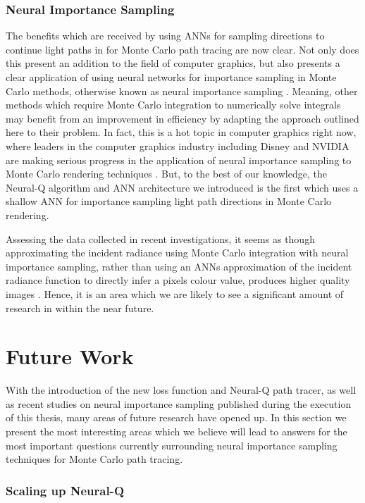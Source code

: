 \documentclass[../dissertation.tex]{subfiles}
\begin{document}
\subsubsection*{Neural Importance Sampling}
The benefits which are received by using ANNs for sampling directions to continue light paths in for Monte Carlo path tracing are now clear. Not only does this present an addition to the field of computer graphics, but also presents a clear application of using neural networks for importance sampling in Monte Carlo methods, otherwise known as neural importance sampling \cite{keller2019integral}. Meaning, other methods which require Monte Carlo integration to numerically solve integrals may benefit from an improvement in efficiency by adapting the approach outlined here to their problem. In fact, this is a hot topic in computer graphics right now, where leaders in the computer graphics industry including Disney and NVIDIA are making serious progress in the application of neural importance sampling to Monte Carlo rendering techniques \cite{keller2019integral, muller2018neural}. But, to the best of our knowledge, the Neural-Q algorithm and ANN architecture we introduced is the first which uses a shallow ANN for importance sampling light path directions in Monte Carlo rendering.

Assessing the data collected in recent investigations, it seems as though approximating the incident radiance using Monte Carlo integration with neural importance sampling, rather than using an ANNs approximation of the incident radiance function to directly infer a pixels colour value, produces higher quality images \cite{zheng2018learning, keller2019integral, muller2018neural}. Hence, it is an area which we are likely to see a significant amount of research in within the near future.

\section{Future Work}

With the introduction of the new loss function and Neural-Q path tracer, as well as recent studies on neural importance sampling published during the execution of this thesis, many areas of future research have opened up. In this section we present the most interesting areas which we believe will lead to answers for the most important questions currently surrounding neural importance sampling techniques for Monte Carlo path tracing. 

\subsubsection{Scaling up Neural-Q}
\end{document}
